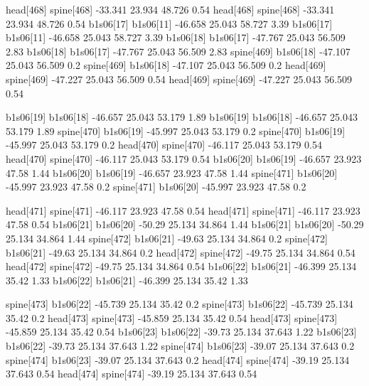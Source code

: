 head[468]    spine[468]    -33.341    23.934    48.726    0.54
head[468]    spine[468]    -33.341    23.934    48.726    0.54
b1s06[17]    b1s06[11]    -46.658    25.043    58.727    3.39
b1s06[17]    b1s06[11]    -46.658    25.043    58.727    3.39
b1s06[18]    b1s06[17]    -47.767    25.043    56.509    2.83
b1s06[18]    b1s06[17]    -47.767    25.043    56.509    2.83
spine[469]    b1s06[18]    -47.107    25.043    56.509    0.2
spine[469]    b1s06[18]    -47.107    25.043    56.509    0.2
head[469]    spine[469]    -47.227    25.043    56.509    0.54
head[469]    spine[469]    -47.227    25.043    56.509    0.54


b1s06[19]    b1s06[18]    -46.657    25.043    53.179    1.89
b1s06[19]    b1s06[18]    -46.657    25.043    53.179    1.89
spine[470]    b1s06[19]    -45.997    25.043    53.179    0.2
spine[470]    b1s06[19]    -45.997    25.043    53.179    0.2
head[470]    spine[470]    -46.117    25.043    53.179    0.54
head[470]    spine[470]    -46.117    25.043    53.179    0.54
b1s06[20]    b1s06[19]    -46.657    23.923    47.58    1.44
b1s06[20]    b1s06[19]    -46.657    23.923    47.58    1.44
spine[471]    b1s06[20]    -45.997    23.923    47.58    0.2
spine[471]    b1s06[20]    -45.997    23.923    47.58    0.2


head[471]    spine[471]    -46.117    23.923    47.58    0.54
head[471]    spine[471]    -46.117    23.923    47.58    0.54
b1s06[21]    b1s06[20]    -50.29    25.134    34.864    1.44
b1s06[21]    b1s06[20]    -50.29    25.134    34.864    1.44
spine[472]    b1s06[21]    -49.63    25.134    34.864    0.2
spine[472]    b1s06[21]    -49.63    25.134    34.864    0.2
head[472]    spine[472]    -49.75    25.134    34.864    0.54
head[472]    spine[472]    -49.75    25.134    34.864    0.54
b1s06[22]    b1s06[21]    -46.399    25.134    35.42    1.33
b1s06[22]    b1s06[21]    -46.399    25.134    35.42    1.33


spine[473]    b1s06[22]    -45.739    25.134    35.42    0.2
spine[473]    b1s06[22]    -45.739    25.134    35.42    0.2
head[473]    spine[473]    -45.859    25.134    35.42    0.54
head[473]    spine[473]    -45.859    25.134    35.42    0.54
b1s06[23]    b1s06[22]    -39.73    25.134    37.643    1.22
b1s06[23]    b1s06[22]    -39.73    25.134    37.643    1.22
spine[474]    b1s06[23]    -39.07    25.134    37.643    0.2
spine[474]    b1s06[23]    -39.07    25.134    37.643    0.2
head[474]    spine[474]    -39.19    25.134    37.643    0.54
head[474]    spine[474]    -39.19    25.134    37.643    0.54


